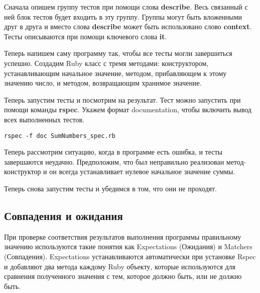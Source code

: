 Сначала опишем группу тестов при помощи слова \textbf{describe}. Весь связанный с ней блок тестов будет входить в эту группу. Группы могут быть вложенными друг в друга и вместо слова \textbf{describe} может быть использовано слово \textbf{context}. Тесты описываются при помощи ключевого слова \textbf{it}.



Теперь напишем саму программу так, чтобы все тесты могли завершиться успешно. Создадим Ruby класс с тремя методами: конструктором, устанавливающим начальное значение, методом, прибавляющем к этому значению число, и методом, возвращающим хранимое значение.



Теперь запустим тесты и посмотрим на результат. Тест можно запустить при помощи команды \textbf{rspec}. Укажем формат documentation, чтобы включить вывод всех выполненных тестов.

\begin{verbatim}
rspec -f doc SumNumbers_spec.rb
\end{verbatim}


Теперь рассмотрим ситуацию, когда в программе есть ошибка, и тесты завершаются неудачно. Предположим, что был неправильно реализован метод-конструктор и он всегда устанавливает нулевое начальное значение суммы.



Теперь снова запустим тесты и убедимся в том, что они не проходят.


\subsection{Совпадения и ожидания}

При проверке соответствия результатов выполнения программы правильному значению используются такие понятия как Expectations (Ожидания) и Matchers (Совпадения). Expectations устанавливаются автоматически при установке Rspec и добавляют два метода каждому Ruby объекту, которые используются для сравнения полученного значения с тем, которое должно быть, или не должно быть.

